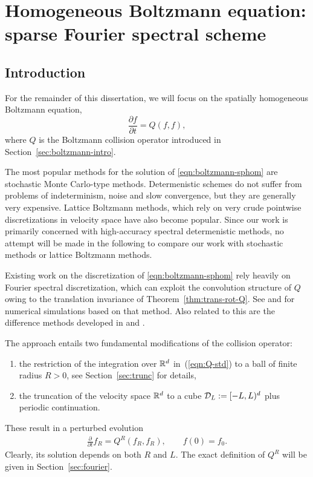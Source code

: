 \chapter{Homogeneous Boltzmann equation: sparse Fourier spectral scheme}
\label{chap:boltzmann-fourier}

\section{Introduction} 
\label{sect:boltzmann}

For the remainder of this dissertation, we will focus on the spatially homogeneous Boltzmann equation,
\begin{equation} \label{eqn:boltzmann-sphom}
    \frac{\partial f}{\partial t} = Q(f,f),
\end{equation}
where $Q$ is the Boltzmann collision operator introduced in Section~\ref{sec:boltzmann-intro}.

The most popular methods for the solution of \eqref{eqn:boltzmann-sphom} are stochastic Monte Carlo-type
methods. Determenistic schemes do not suffer from problems of indeterminism, noise and slow convergence, but
they are generally very expensive. Lattice Boltzmann methods, which rely on very crude pointwise
discretizations in velocity space have also become popular. Since our work is primarily concerned with
high-accuracy spectral determenistic methods, no attempt will be made in the following to compare our work
with stochastic methods or lattice Boltzmann methods.

Existing work on the discretization of \eqref{eqn:boltzmann-sphom} rely heavily on Fourier spectral
discretization, which can exploit the convolution structure of $Q$ owing to the translation invariance of
Theorem~\ref{thm:trans-rot-Q}. See \cite{Bobylev88, Kirsch07, Pareschi96} and \cite{Gamba09, Gamba10,
Filbet06, Pareschi00, Pareschi03} for numerical simulations based on that method. Also related to this are the
difference methods developed in \cite{BobylevR97, Bobylev99, Bobylev00} and \cite{Ibragimov02}.

The approach entails two fundamental modifications of the collision operator:
\begin{enumerate}
  \renewcommand{\labelenumi}{(\roman{enumi})}
  \item the restriction of the integration over $\mathbb{R}^{d}$ in~(\ref{eqn:Q-std}) to 
    a ball of finite radius $R>0$, see Section~\ref{sec:trunc} for details, 
  \item the truncation of the velocity space $\mathbb{R}^{d}$ to a cube $\mathcal{D}_{L} := [-L,L)^{d}$ plus
    periodic continuation. 
\end{enumerate}
These result in a perturbed evolution
\begin{gather}
  \label{eqn:QR}
  \frac{\partial}{\partial t}{f}_R = Q^R(f_R, f_R), \qquad f(0) = f_0.
\end{gather}
Clearly, its solution depends on both $R$ and $L$. The exact definition of $Q^R$ will be given in
Section~\ref{sec:fourier}.

